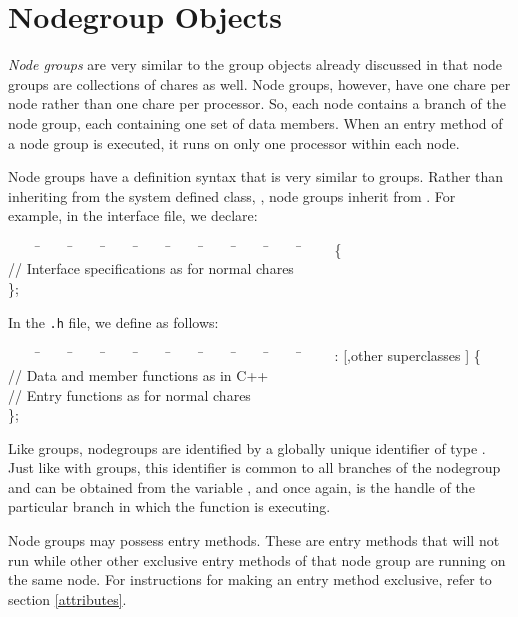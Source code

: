 \section{Nodegroup Objects}

{\it Node groups}   are very
similar to the group objects already discussed in that node groups are
collections of chares as well.  Node groups, however, have one chare
per node rather than one chare per processor.
So, each node contains a branch of the node group, each containing one
set of data members.  When an entry method of a node group is
executed, it runs on only one processor within each
node.

Node groups have a definition syntax that is very similar to groups.  Rather
than inheriting from the system defined class, , node groups 
inherit from .  For example, in the interface file, we declare:

\begin{tabbing}
~~~~ \=~~~~ \=~~~~ \=~~~~ \=~~~~ \=~~~~ \=~~~~ \=~~~~ \=~~~~ \=~~~~ \kill
\>   \{ \\
\> \> // Interface specifications as for normal chares \\
\> \};
\end{tabbing}

In the {\tt .h} file, we define  as follows:

\begin{tabbing}
~~~~ \=~~~~ \=~~~~ \=~~~~ \=~~~~ \=~~~~ \=~~~~ \=~~~~ \=~~~~ \=~~~~ \kill
\>   :  [,other
superclasses ] \{ \\
\> \> // Data and member functions as in C++ \\
\> \> // Entry functions as for normal chares \\
\> \};
\end{tabbing}

Like groups, nodegroups are identified by a globally unique identifier
of type .  Just like with groups, this 
identifier is
common to all branches of the nodegroup and can be obtained from the
variable , and once again, 
 is the handle of the particular branch in which the function 
is executing.

Node groups may possess  entry methods.  
These are entry methods that will not run while other other exclusive entry 
methods of that node group are running on the same node.  For instructions 
for making an entry method exclusive, refer to section \ref{attributes}.

